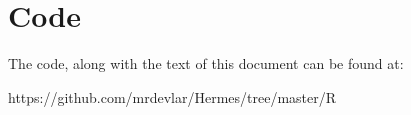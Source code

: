 



\section*{Code}

The code, along with the text of this document can be found at:

https://github.com/mrdevlar/Hermes/tree/master/R

